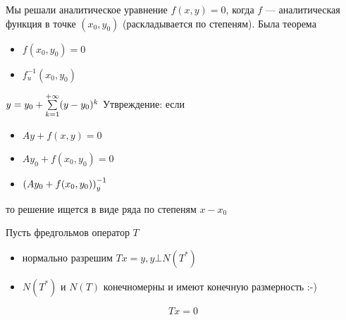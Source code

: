 Мы решали аналитическое уравнение $f(x,y) = 0$, когда $f$ --- аналитическая функция в точке $(x_0, y_0)$ (раскладывается по степеням).
Была теорема
\begin{itemize}
	\item $f(x_0, y_0) = 0$
	\item $f^{-1}_u(x_0,y_0)$
\end{itemize}
$y = y_0 + \sum\limits_{k=1}^{+\infty}(y-y_0)^k$
Утвреждение: если
\begin{itemize}
	\item $Ay + f(x,y) = 0$
	\item $Ay_0 + f(x_0,y_0) = 0$
	\item $\left(Ay_0 + f(x_0,y_0)\right)^{-1}_y$
\end{itemize}
то решение ищется в виде ряда по степеням $x-x_0$


Пусть фредгольмов оператор $T$
\begin{itemize}
	\item нормально разрешим $Tx = y, y \bot N(T^*)$
	\item $N(T^*)$ и $N(T)$ конечномерны и имеют конечную размерность :-)
\end{itemize}

$$Tx = 0$$


